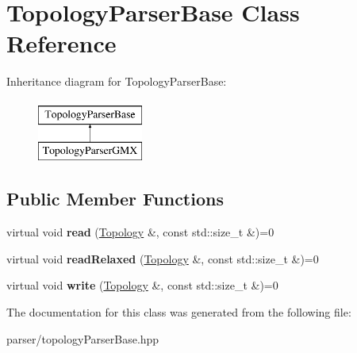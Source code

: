 \hypertarget{classTopologyParserBase}{}\section{Topology\+Parser\+Base Class Reference}
\label{classTopologyParserBase}
Inheritance diagram for Topology\+Parser\+Base\+:\begin{figure}[H]
\begin{center}
\leavevmode
\includegraphics[height=2.000000cm]{classTopologyParserBase}
\end{center}
\end{figure}
\subsection*{Public Member Functions}
\begin{DoxyCompactItemize}
\item 
\mbox{\label{classTopologyParserBase_ab793e27d1afb4c167112a39ed4694405}} 
virtual void {\bfseries read} (\mbox{\hyperlink{classTopology}{Topology}} \&, const std\+::size\+\_\+t \&)=0
\item 
\mbox{\label{classTopologyParserBase_ad48ed8f34ef58e18db398c1aa4dd15cb}} 
virtual void {\bfseries read\+Relaxed} (\mbox{\hyperlink{classTopology}{Topology}} \&, const std\+::size\+\_\+t \&)=0
\item 
\mbox{\label{classTopologyParserBase_a7843761ed48d512c19f977c7fe1906e3}} 
virtual void {\bfseries write} (\mbox{\hyperlink{classTopology}{Topology}} \&, const std\+::size\+\_\+t \&)=0
\end{DoxyCompactItemize}


The documentation for this class was generated from the following file\+:\begin{DoxyCompactItemize}
\item 
parser/topology\+Parser\+Base.\+hpp\end{DoxyCompactItemize}
